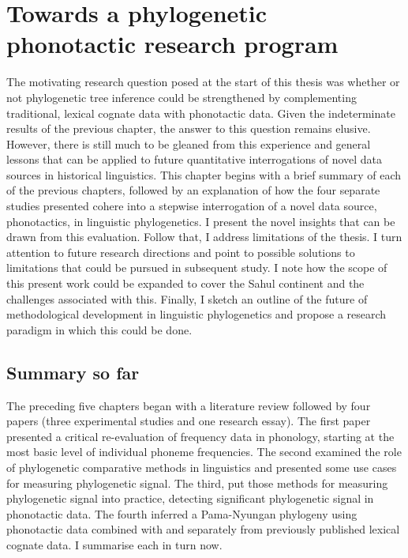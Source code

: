 \chapter[Towards phylogenetic phonotactics]{Towards a phylogenetic phonotactic research program}
\label{Chap:Discussion}

The motivating research question posed at the start of this thesis was whether or not phylogenetic tree inference could be strengthened by complementing traditional, lexical cognate data with phonotactic data. Given the indeterminate results of the previous chapter, the answer to this question remains elusive. However, there is still much to be gleaned from this experience and general lessons that can be applied to future quantitative interrogations of novel data sources in historical linguistics. This chapter begins with a brief summary of each of the previous chapters, followed by an explanation of how the four separate studies presented cohere into a stepwise interrogation of a novel data source, phonotactics, in linguistic phylogenetics. I present the novel insights that can be drawn from this evaluation. Follow that, I address limitations of the thesis. I turn attention to future research directions and point to possible solutions to limitations that could be pursued in subsequent study. I note how the scope of this present work could be expanded to cover the Sahul continent and the challenges associated with this. Finally, I sketch an outline of the future of methodological development in linguistic phylogenetics and propose a research paradigm in which this could be done.

\hypertarget{discussion-intro}{%
\section{Summary so far}\label{discussion-intro}}

The preceding five chapters began with a literature review followed by four papers (three experimental studies and one research essay). The first paper presented a critical re-evaluation of frequency data in phonology, starting at the most basic level of individual phoneme frequencies. The second examined the role of phylogenetic comparative methods in linguistics and presented some use cases for measuring phylogenetic signal. The third, put those methods for measuring phylogenetic signal into practice, detecting significant phylogenetic signal in phonotactic data. The fourth inferred a Pama-Nyungan phylogeny using phonotactic data combined with and separately from previously published lexical cognate data. I summarise each in turn now.

